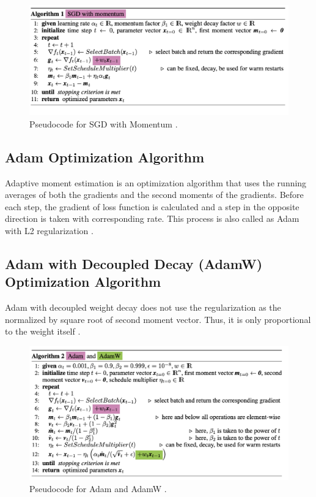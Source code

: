 \begin{figure}[h]
	\centering
	\includegraphics[width=\linewidth]{fig/sgd_momentum.png}
	\caption{Pseudocode for SGD with Momentum \cite{weight_decay_regularization}.}
	\label{sgd_momentum}
\end{figure}

\subsection{Adam Optimization Algorithm}

Adaptive moment estimation is an optimization algorithm that uses the running averages of both the gradients and the second moments of the gradients. Before each step, the gradient of loss function is calculated and a step in the opposite direction is taken with corresponding rate. This process is also called as Adam with L2 regularization \cite{Adam}.

\subsection{Adam with Decoupled Decay (AdamW) Optimization Algorithm}

Adam with decoupled weight decay does not use the regularization as the normalized by square root of second moment vector. Thus, it is only proportional to the weight itself \cite{Adam}.

\begin{figure}[h]
	\centering
	\includegraphics[width=\linewidth]{fig/adam_n_adamw.png}
	\vspace*{1mm}
	\caption{Pseudocode for Adam and AdamW \cite{weight_decay_regularization}.}
	\label{adam_and_adamw}
\end{figure}

